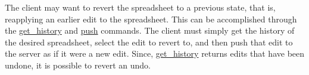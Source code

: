 The client may want to revert the spreadsheet to a previous state, that is, 
reapplying an earlier edit to the spreadsheet. This can be accomplished 
through the \hyperref[sec:message:get_history]{get\_history} and \hyperref[sec:message:push]{push} 
commands. The client must simply get the history of the desired spreadsheet, 
select the edit to revert to, and then push that edit to the server as if it 
were a new edit. Since, \hyperref[sec:message:get_history]{get\_history} 
returns edits that have been undone, it is possible to revert an undo.